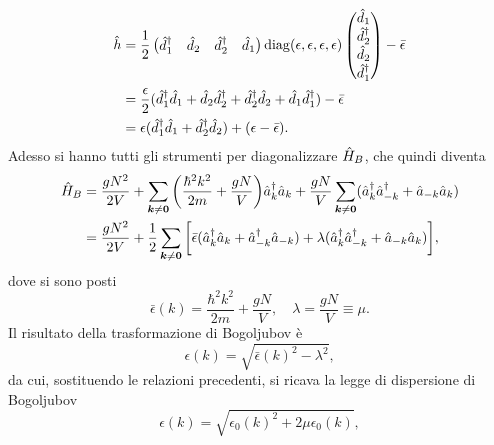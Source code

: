 \begin{equation}
    \begin{split}
        \hat{h} &= \frac{1}{2}
        \begin{pmatrix}
            \hat{d}^\dagger_1 & \hat{d}_2 & \hat{d}^\dagger_2 & \hat{d}_1
        \end{pmatrix}
        \mathrm{diag}(\epsilon, \epsilon, \epsilon, \epsilon)
        \begin{pmatrix}
            \hat{d}_1 \\
            \hat{d}^\dagger_2 \\
            \hat{d}_2 \\
            \hat{d}^\dagger_1
        \end{pmatrix}
        - \bar{\epsilon} \\
        &= \frac{\epsilon}{2}(\hat{d}^\dagger_1\hat{d}_1 + \hat{d}_2\hat{d}^\dagger_2 + \hat{d}^\dagger_2\hat{d}_2 + \hat{d}_1\hat{d}^\dagger_1) - \bar{\epsilon} \\
        &= \epsilon(\hat{d}^\dagger_1\hat{d}_1 + \hat{d}^\dagger_2\hat{d}_2) + (\epsilon - \bar{\epsilon}).
    \end{split}
\end{equation}
Adesso si hanno tutti gli strumenti per diagonalizzare $\hat{H}_B$, che quindi diventa
\begin{equation}
    \begin{split}
        \hat{H}_B &= \frac{gN^2}{2V} + \sum_{\bm{k} \neq \bm{0}}\bigg(\frac{\hbar^2k^2}{2m} + \frac{gN}{V}\bigg)\hat{a}^\dagger_k\hat{a}_k + \frac{gN}{V}\sum_{\bm{k} \neq \bm{0}}(\hat{a}^\dagger_k\hat{a}^\dagger_{-k} + \hat{a}_{-k}\hat{a}_k) \\
        &= \frac{gN^2}{2V} + \frac{1}{2}\sum_{\bm{k} \neq \bm{0}}\bigg[\bar{\epsilon}(\hat{a}^\dagger_k\hat{a}_k + \hat{a}^\dagger_{-k}\hat{a}_{-k}) + \lambda(\hat{a}^\dagger_k\hat{a}^\dagger_{-k} + \hat{a}_{-k}\hat{a}_k)\bigg],
    \end{split}
\end{equation}
dove si sono posti
\begin{equation}
    \bar{\epsilon}(k) = \frac{\hbar^2k^2}{2m} + \frac{gN}{V},\quad \lambda = \frac{gN}{V} \equiv \mu.
\end{equation}
Il risultato della trasformazione di Bogoljubov è
\begin{equation}
    \epsilon(k) = \sqrt{\bar{\epsilon}(k)^2 - \lambda^2},
\end{equation}
da cui, sostituendo le relazioni precedenti, si ricava la legge di dispersione di Bogoljubov
\begin{equation}
\label{eq: legge di dispersione di Bogoljubov}
    \epsilon(k) = \sqrt{\epsilon_0(k)^2 + 2\mu\epsilon_0(k)},
\end{equation}
